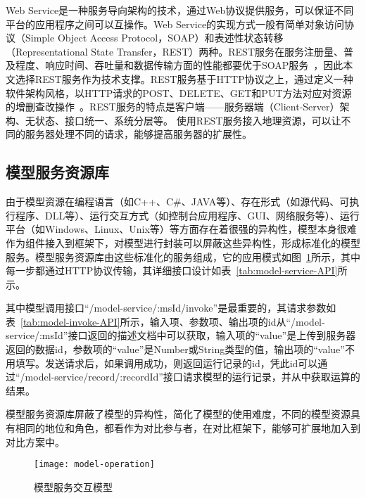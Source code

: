 Web Service是一种服务导向架构的技术，通过Web协议提供服务，可以保证不同平台的应用程序之间可以互操作。Web Service的实现方式一般有简单对象访问协议（Simple Object Access Protocol，SOAP）和表述性状态转移（Representational State Transfer，REST）两种。REST服务在服务注册量、普及程度、响应时间、吞吐量和数据传输方面的性能都要优于SOAP服务~\cite{2015互联网上基于}，因此本文选择REST服务作为技术支撑。REST服务基于HTTP协议之上，通过定义一种软件架构风格，以HTTP请求的POST、DELETE、GET和PUT方法对应对资源的增删查改操作~\cite{fielding2000architectural}。REST服务的特点是客户端——服务器端（Client-Server）架构、无状态、接口统一、系统分层等。
使用REST服务接入地理资源，可以让不同的服务器处理不同的请求，能够提高服务器的扩展性。

\subsection{模型服务资源库}
由于模型资源在编程语言（如C++、C\#、JAVA等）、存在形式（如源代码、可执行程序、DLL等）、运行交互方式（如控制台应用程序、GUI、网络服务等）、运行平台（如Windows、Linux、Unix等）等方面存在着很强的异构性，模型本身很难作为组件接入到框架下，对模型进行封装可以屏蔽这些异构性，形成标准化的模型服务。模型服务资源库由这些标准化的服务组成，它的应用模式如图~\ref{fig:model-operation}所示，其中每一步都通过HTTP协议传输，其详细接口设计如表~\ref{tab:model-service-API}所示。

其中模型调用接口“/model-service/:msId/invoke”是最重要的，其请求参数如表~\ref{tab:model-invoke-API}所示，输入项、参数项、输出项的id从“/model-service/:msId”接口返回的描述文档中可以获取，输入项的“value”是上传到服务器返回的数据id，参数项的“value”是Number或String类型的值，输出项的“value”不用填写。发送请求后，如果调用成功，则返回运行记录的id，凭此id可以通过“/model-service/record/:recordId”接口请求模型的运行记录，并从中获取运算的结果。

模型服务资源库屏蔽了模型的异构性，简化了模型的使用难度，不同的模型资源具有相同的地位和角色，都看作为对比参与者，在对比框架下，能够可扩展地加入到对比方案中。

\begin{figure}[!htbp]
    \centering
    \texttt{[image: model-operation]}
    \caption{模型服务交互模型}
    \label{fig:model-operation}
\end{figure}

